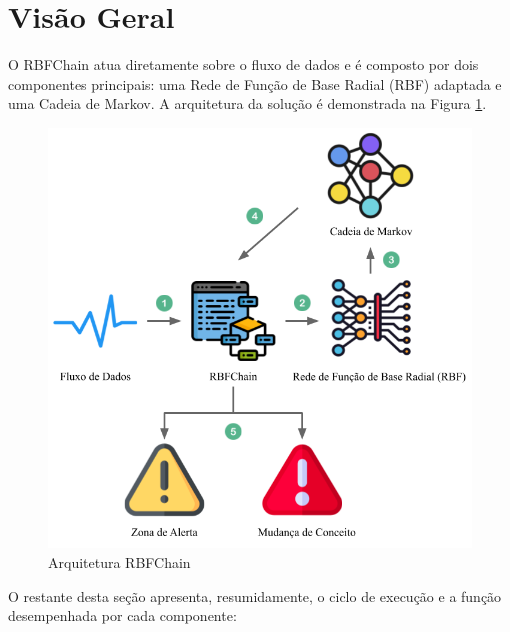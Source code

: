 \documentclass[msc, classic, a4paper]{ufbathesis}
\begin{document}
\section{Visão Geral}
\label{sec:rbfchain_visao_geral}

O RBFChain atua diretamente sobre o fluxo de dados e é composto por dois componentes principais: uma Rede de Função de Base Radial (RBF) adaptada e uma Cadeia de Markov.
A arquitetura da solução é demonstrada na Figura \ref{fig:arquitetura}. 

\begin{figure}[H]
    \begin{center}
        \includegraphics[scale=0.6]{imagens/arquitetura_rbfchain.png}
        \caption{Arquitetura RBFChain}
        \label{fig:arquitetura}
    \end{center}
\end{figure}

O restante desta seção apresenta, resumidamente, o ciclo de execução e a função desempenhada por cada componente:
\end{document}
